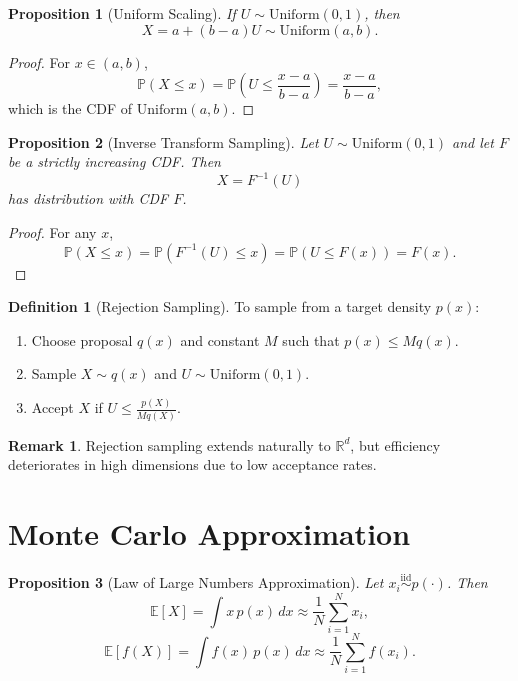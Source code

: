 \documentclass[12pt,oneside]{book}
\numberwithin{equation}{section}
\theoremstyle{definition}
\newtheorem{definition}{Definition}[section]
\newtheorem{remark}{Remark}[section]
\theoremstyle{plain}
\newtheorem{proposition}{Proposition}[section]
\theoremstyle{remark}
\newcommand{\R}{\mathbb{R}}
\newcommand{\E}{\mathbb{E}}
\newcommand{\Prob}{\mathbb{P}}
\newcommand{\iid}{\overset{\text{iid}}{\sim}}
\begin{document}
\begin{proposition}[Uniform Scaling]
If $U \sim \mathrm{Uniform}(0,1)$, then
\[
X = a + (b-a)U \sim \mathrm{Uniform}(a,b).
\]
\end{proposition}

\begin{proof}
For $x \in (a,b)$,
\[
\Prob(X \leq x) = \Prob\left(U \leq \frac{x-a}{b-a}\right) = \frac{x-a}{b-a},
\]
which is the CDF of $\mathrm{Uniform}(a,b)$.
\end{proof}

\begin{proposition}[Inverse Transform Sampling]
Let $U \sim \mathrm{Uniform}(0,1)$ and let $F$ be a strictly increasing CDF. Then
\[
X = F^{-1}(U)
\]
has distribution with CDF $F$.
\end{proposition}

\begin{proof}
For any $x$,
\[
\Prob(X \leq x) = \Prob(F^{-1}(U) \leq x)
= \Prob(U \leq F(x)) = F(x).
\]
\end{proof}

\begin{definition}[Rejection Sampling]
To sample from a target density $p(x)$:
\begin{enumerate}
    \item Choose proposal $q(x)$ and constant $M$ such that $p(x) \leq M q(x)$.
    \item Sample $X \sim q(x)$ and $U \sim \mathrm{Uniform}(0,1)$.
    \item Accept $X$ if $U \leq \frac{p(X)}{M q(X)}$.
\end{enumerate}
\end{definition}

\begin{remark}
Rejection sampling extends naturally to $\R^d$, but efficiency deteriorates in high dimensions due to low acceptance rates.
\end{remark}

\section{Monte Carlo Approximation}

\begin{proposition}[Law of Large Numbers Approximation]
Let $x_i \iid p(\cdot)$. Then
\[
\E[X] = \int x\,p(x)\,dx \approx \frac{1}{N}\sum_{i=1}^N x_i,
\]
\[
\E[f(X)] = \int f(x)\,p(x)\,dx \approx \frac{1}{N}\sum_{i=1}^N f(x_i).
\]
\end{proposition}
\end{document}
